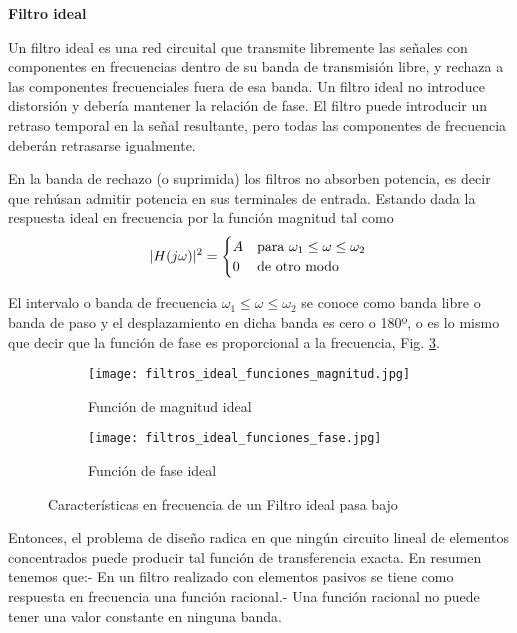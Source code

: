 \documentclass[informe.tex]{subfiles}
\begin{document}
\textbf{Filtro ideal}\newline

Un filtro ideal es una red circuital que transmite libremente las señales con componentes en frecuencias dentro de su banda de transmisión libre, y rechaza a las componentes frecuenciales fuera de esa banda. Un filtro ideal no introduce distorsión y debería mantener la relación de fase.  El filtro puede introducir un retraso temporal en la señal resultante, pero todas las componentes de frecuencia deberán retrasarse igualmente.\newline
 
En la banda de rechazo (o suprimida) los filtros no absorben potencia, es decir que rehúsan admitir potencia en sus terminales de entrada. Estando dada la respuesta ideal en frecuencia por la función magnitud tal como
	$$
	|H(j\omega)|^2 =
	\begin{cases}
		 A  & \mbox{para }\omega_1 \leq \omega \leq \omega_2
		\\
		0       & \mbox{de otro modo }
		\end{cases} \\
	$$

El intervalo o banda de frecuencia $\omega_1 \leq \omega \leq \omega_2 $ se conoce como banda libre o banda de paso y el desplazamiento en dicha banda es cero o 180º, o es lo mismo que decir que la función de fase es proporcional a la frecuencia, Fig. \ref{fig:filtros:ideal:funciones}.\newline

\begin{figure}[h]
     \centering
     \begin{subfigure}[b]{0.5\textwidth}
         \centering
         \texttt{[image: filtros\_ideal\_funciones\_magnitud.jpg]}
         \caption{Función de magnitud ideal}
         \label{fig:filtros:ideal:funciones:magnitud}
     \end{subfigure}
     \bigskip
     \begin{subfigure}[b]{0.5\textwidth}
         \centering
         \texttt{[image: filtros\_ideal\_funciones\_fase.jpg]}
         \caption{Función de fase ideal}
         \label{fig:filtros:ideal:funciones:fase}
     \end{subfigure}
     \caption{Características en frecuencia de un Filtro ideal pasa bajo}
     \label{fig:filtros:ideal:funciones}
\end{figure}


Entonces, el problema de diseño radica en que ningún circuito lineal de elementos concentrados puede producir tal función de transferencia exacta. En resumen tenemos que:- En un filtro realizado con elementos pasivos se tiene como respuesta en frecuencia una función racional.- Una función racional no puede tener una valor constante en ninguna banda.\newline
\end{document}

